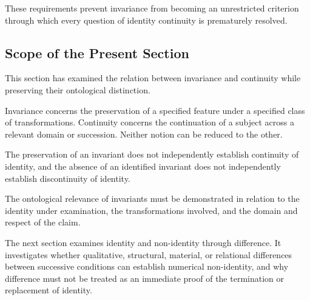 These requirements prevent invariance from becoming
an unrestricted criterion through which every question
of identity continuity is prematurely resolved.

\subsection{Scope of the Present Section}

This section has examined the relation between
invariance and continuity while preserving their
ontological distinction.

Invariance concerns the preservation of a specified
feature under a specified class of transformations.
Continuity concerns the continuation of a subject
across a relevant domain or succession. Neither
notion can be reduced to the other.

The preservation of an invariant does not independently
establish continuity of identity, and the absence
of an identified invariant does not independently
establish discontinuity of identity.

The ontological relevance of invariants must be
demonstrated in relation to the identity under
examination, the transformations involved, and
the domain and respect of the claim.

The next section examines identity and non-identity
through difference. It investigates whether qualitative,
structural, material, or relational differences
between successive conditions can establish numerical
non-identity, and why difference must not be treated
as an immediate proof of the termination or replacement
of identity.

